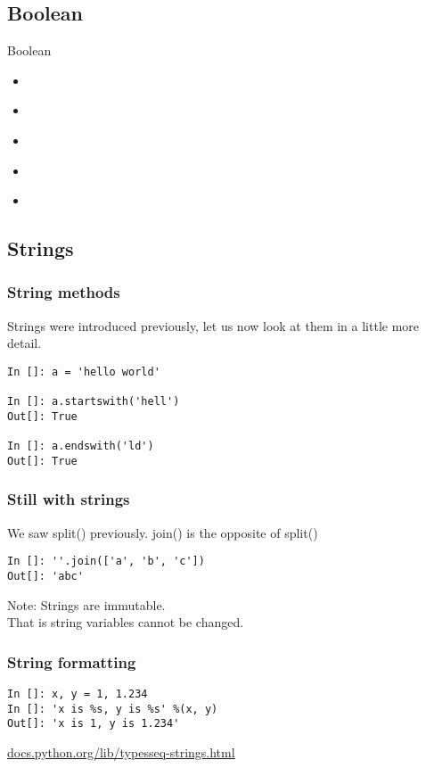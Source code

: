 \documentclass[14pt,compress]{beamer}
\newcounter{time}
\newcommand{\inctime}[1]{\addtocounter{time}{#1}{\tiny \thetime\ m}}
\newcommand{\kwrd}[1]{ \texttt{\textbf{\color{blue}{#1}}}  }
\begin{document}
\subsection{Boolean}
\begin{frame}{Boolean}
  \begin{itemize}
    \item \kwrd{True}
    \item \kwrd{False}
    \item \kwrd{not}
    \item \kwrd{and}
    \item \kwrd{or}
  \end{itemize}
\end{frame}

\subsection{Strings}
\begin{frame}[fragile]
  \frametitle{String methods}
Strings were introduced previously, let us now look at them in a little more detail.
  \begin{lstlisting}
In []: a = 'hello world'

In []: a.startswith('hell')
Out[]: True

In []: a.endswith('ld')
Out[]: True
  \end{lstlisting}
\end{frame}

\begin{frame}[fragile]
\frametitle{Still with strings}
We saw split() previously. join() is the opposite of split()
  \begin{lstlisting}
In []: ''.join(['a', 'b', 'c'])
Out[]: 'abc'
  \end{lstlisting}
  \begin{block}{Note:}
Strings are immutable.\\ That is string variables cannot be changed.
  \end{block}
\end{frame}

\begin{frame}[fragile]
\frametitle{String formatting}
  \begin{lstlisting}
In []: x, y = 1, 1.234
In []: 'x is %s, y is %s' %(x, y)
Out[]: 'x is 1, y is 1.234'
  \end{lstlisting}
  \small
\url{docs.python.org/lib/typesseq-strings.html}\\
\inctime{10}
\end{frame}
\end{document}
